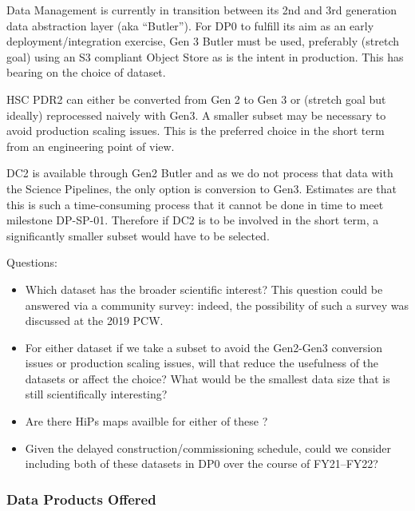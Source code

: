 Data Management is currently in transition between its 2nd and 3rd generation data abstraction layer (aka ``Butler''). For DP0 to fulfill its aim as an early deployment/integration exercise, Gen 3 Butler must be used, preferably (stretch goal) using an S3 compliant Object Store as is the intent in production. This has bearing on the choice of dataset.

HSC PDR2 can either be converted from Gen 2 to Gen 3 or (stretch goal but ideally) reprocessed naively with Gen3. A smaller subset may be necessary to avoid production scaling issues. This is the preferred choice in the short term from an engineering point of view.

DC2 is available through Gen2 Butler and as we do not process that data with the Science Pipelines, the only option is conversion to Gen3. Estimates are that this is such a time-consuming process that it cannot be done in time to meet milestone DP-SP-01. Therefore if DC2 is to be involved in the short term, a significantly smaller subset would have to be selected.

Questions:

\begin{itemize}

\item Which dataset has the broader scientific interest? This question could be answered via a community survey: indeed, the possibility of such a survey was discussed at the 2019 PCW.

\item For either dataset if we take a subset to avoid the Gen2-Gen3 conversion issues or production scaling issues, will that reduce the usefulness of the datasets or affect the choice? What would be the smallest data size that is still scientifically interesting?

\item Are there HiPs maps availble for either of these ?


\item Given the delayed construction/commissioning schedule, could we consider including both of these datasets in DP0 over the course of FY21--FY22?

\end{itemize}

\subsubsection{Data Products Offered}

